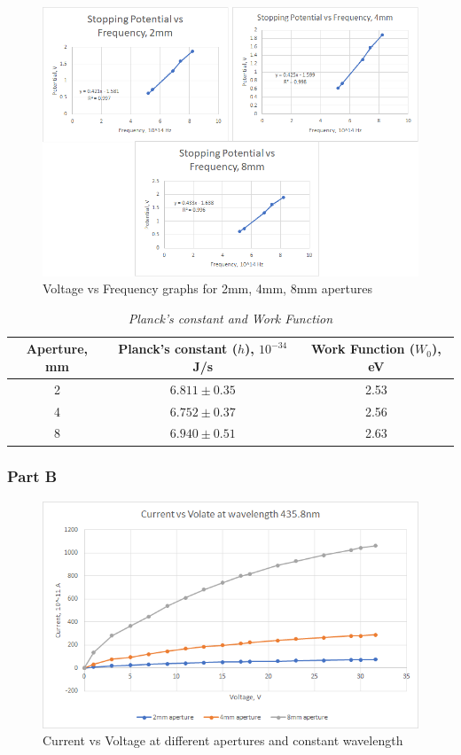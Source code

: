 \documentclass{article}
\begin{document}
 \begin{figure}[H]
    \centering
    \includegraphics[width=.9\linewidth]{part1lab3.png} 
    \caption{Voltage vs Frequency graphs for 2mm, 4mm, 8mm apertures}
    \label{fig:calib}
    \end{figure}

\begin{table}[H]
       \centering
       \caption{ \textit{Planck's constant and Work Function}}
       \begin{tabular}{| c |c| c |}
       \hline
       Aperture, mm & Planck's constant ($h$), $10^{-34}$J/s& Work Function ($W_0$), eV\\
       \hline
       2 &   $6.811\pm0.35$ &  2.53  \\
       \hline
       4   &  $6.752\pm0.37$   &  2.56  \\
       \hline
       8 &  $6.940\pm0.51$   &  2.63   \\
       \hline
       \end{tabular}
   \end{table}   
   
   
\subsubsection{Part B}


 \begin{figure}[H]
    \centering
    \includegraphics[width=.9\linewidth]{part2lab3.png} 
    \caption{Current vs Voltage at different apertures and constant wavelength}
    \label{fig:calib}
    \end{figure}
\end{document}
